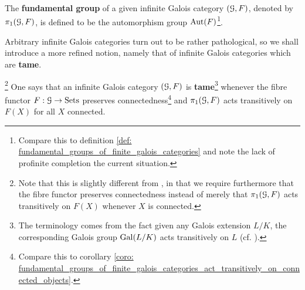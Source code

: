             \begin{definition} \label{def: fundamental_groups_of_infinite_galois_categories}
                The \textbf{fundamental group} of a given infinite Galois category $(\mathcal{G}, F)$, denoted by $\pi_1(\mathcal{G}, F)$, is defined to be the automorphism group $\mathrm{Aut}(F)$\footnote{Compare this to definition \ref{def: fundamental_groups_of_finite_galois_categories} and note the lack of profinite completion the current situation.}.
            \end{definition}
            Arbitrary infinite Galois categories turn out to be rather pathological, so we shall introduce a more refined notion, namely that of infinite Galois categories which are \textbf{tame}.  
            \begin{definition} \label{def: tame_infinite_galois_categories}
                \footnote{Note that this is slightly different from \cite[Definition 7.2.4]{bhatt_scholze_2014_pro_etale}, in that we require furthermore that the fibre functor preserves connectedness instead of merely that $\pi_1(\mathcal{G}, F)$ acts transitively on $F(X)$ whenever $X$ is connected.} One says that an infinite Galois category $(\mathcal{G}, F)$ is \textbf{tame}\footnote{The terminology comes from the fact given any Galois extension $L/K$, the corresponding Galois group $\mathrm{Gal}(L/K)$ acts transitively on $L$ (cf. \cite[Proposition I.9.1]{neukirch_2010_algebraic_number_theory}).} whenever the fibre functor $F: \mathcal{G} \to \mathrm{Sets}$ preserves connectedness\footnote{Compare this to corollary \ref{coro: fundamental_groups_of_finite_galois_categories_act_transitively_on_connected_objects}.} and $\pi_1(\mathcal{G}, F)$ acts transitively on $F(X)$ for all $X$ connected.
            \end{definition}
            
